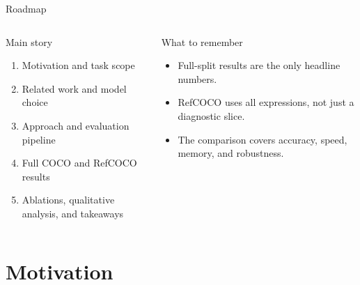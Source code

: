 \documentclass[aspectratio=169,professionalfonts]{beamer}
\begin{document}
\begin{frame}{Roadmap}
  \begin{columns}[T,onlytextwidth]
    \begin{block}{Main story}
      \begin{enumerate}
        \item Motivation and task scope
        \item Related work and model choice
        \item Approach and evaluation pipeline
        \item Full COCO and RefCOCO results
        \item Ablations, qualitative analysis, and takeaways
      \end{enumerate}
    \end{block}

    \begin{block}{What to remember}
      \begin{itemize}
        \item Full-split results are the only headline numbers.
        \item RefCOCO uses all expressions, not just a diagnostic slice.
        \item The comparison covers accuracy, speed, memory, and robustness.
      \end{itemize}
    \end{block}
  \end{columns}
\end{frame}

\section{Motivation}
\end{document}
